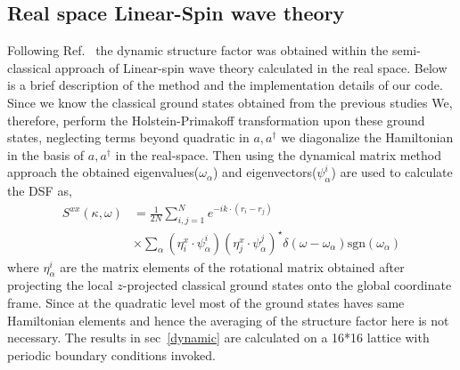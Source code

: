 \subsection{Real space Linear-Spin wave theory}
\label{RSLSWT}
Following Ref.~\cite{moessner2019} the dynamic structure factor was obtained within the semi-classical approach of Linear-spin wave theory calculated in the real space. Below is a brief description of the method and the implementation details of our code. Since we know the classical ground states obtained from the previous studies We, therefore, perform the Holstein-Primakoff transformation upon these ground states, neglecting terms beyond quadratic in $a,a^{\dagger}$ we diagonalize the Hamiltonian in the basis of $a,a^{\dagger}$ in the real-space. Then using the dynamical matrix method approach the obtained eigenvalues($\omega_\alpha$) and eigenvectors($\psi^{i}_{\alpha}$) are used to calculate the DSF as,
\begin{align}
 S^{xx}(\kappa,\omega)&= \frac{1}{2N}\sum_{i,j=1}^{N}e^{-ik\cdot(r_i - r_j)}\\ \nonumber
 & \times \sum_{\alpha}(\eta_{i}^{x}\cdot\psi_{\alpha}^{i})(\eta_{j}^{x}\cdot\psi_{\alpha}^{j})^{\star}\delta(\omega-\omega_\alpha)\text{sgn}(\omega_\alpha)
\end{align}
where $\eta_{\alpha}^{i}$ are the matrix elements of the rotational matrix obtained after projecting the local $z$-projected classical ground states onto the global coordinate frame. Since at the quadratic level most of the ground states haves same Hamiltonian elements and hence the averaging of the structure factor here is not necessary. The results in sec~\ref{dynamic} are calculated on a 16*16 lattice with periodic boundary conditions invoked.
